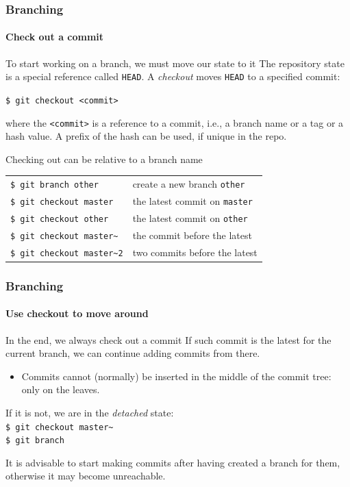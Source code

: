 \begin{frame}
\frametitle{Branching}
\framesubtitle{Check out a commit}

\begin{block}{To start working on a branch, we must move our state to it}
The repository state is a special reference called \texttt{HEAD}. A {\em checkout} moves \texttt{HEAD} to a specified commit:

\texttt{\$ git checkout <commit>}

\medskip
where the \texttt{<commit>} is a reference to a commit, i.e., a branch name or a tag or a hash value. A prefix of the hash can be used, if unique in the repo. 
\end{block}

\pause
\begin{block}{Checking out can be relative to a branch name}
\begin{tabular}{ll}
\texttt{\$ git branch other} & create a new branch \texttt{other} \\
\texttt{\$ git checkout master} & the latest commit on \texttt{master} \\
\texttt{\$ git checkout other} & the latest commit on \texttt{other} \\
\texttt{\$ git checkout master\textasciitilde{}} & the commit before the latest \\
\texttt{\$ git checkout master\textasciitilde{}2} & two commits before the latest
\end{tabular}
\end{block}
\end{frame}

\begin{frame}
\frametitle{Branching}
\framesubtitle{Use checkout to move around}

\begin{block}{In the end, we always check out a commit}
If such commit is the latest for the current branch, we can continue adding commits from there.
\begin{itemize}
\item Commits cannot (normally) be inserted in the middle of the commit tree: only on the leaves.
\end{itemize}
If it is not, we are in the {\em detached} state: \\
\texttt{\$ git checkout master\textasciitilde{}} \\
\texttt{\$ git branch}

\medskip
It is advisable to start making commits after having created a branch for them, otherwise it may become unreachable.
\end{block}

\end{frame}

